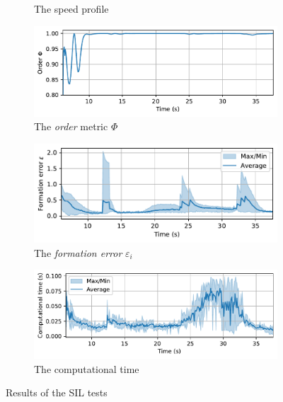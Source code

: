 \begin{figure}
\begin{subfigure}[b]{0.48\textwidth}
    \caption{The speed profile}
    \label{fig:gazebo_speed}
    \end{subfigure}
    \begin{subfigure}[b]{0.48\textwidth}
    \includegraphics[width=\textwidth]{paper3/images/gazebo_order.pdf}
    \caption{The \textit{order} metric $\Phi$}
    \label{fig:gazebo_order}
    \end{subfigure}
    \begin{subfigure}[b]{0.48\textwidth}
    \includegraphics[width=\textwidth]{paper3/images/gazebo_error.pdf}
    \caption{The \textit{formation error} $\varepsilon_i$}
    \label{fig:gazebo_error}
    \end{subfigure}
    \begin{subfigure}[b]{0.48\textwidth}
    \includegraphics[width=\textwidth]{paper3/images/gazebo_computation.pdf}
    \caption{The computational time}
    \label{fig:gazebo_time}
    \end{subfigure}
    \caption{Results of the SIL tests}
    \label{fig:gazebo}
\end{figure}

